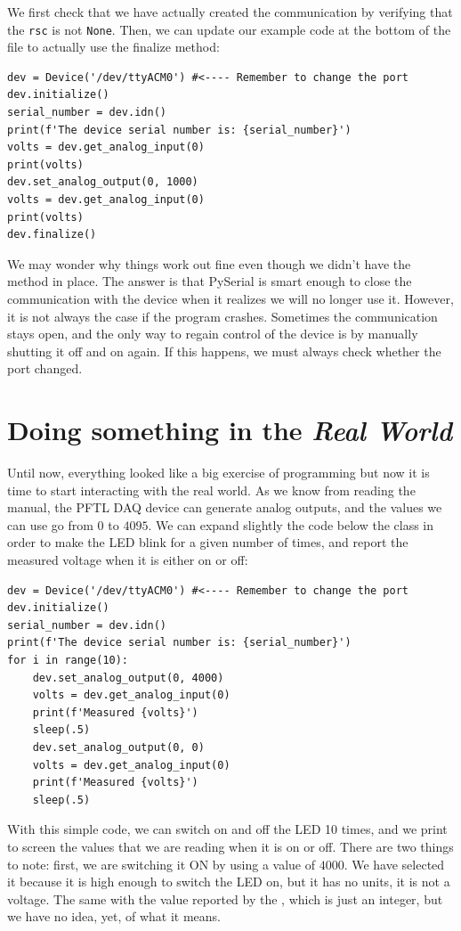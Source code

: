 We first check that we have actually created the communication by verifying that the \texttt{rsc} is not \texttt{None}. Then, we can update our example code at the bottom of the file to actually use the finalize method:

\begin{verbatim}
dev = Device('/dev/ttyACM0') #<---- Remember to change the port
dev.initialize()
serial_number = dev.idn()
print(f'The device serial number is: {serial_number}')
volts = dev.get_analog_input(0)
print(volts)
dev.set_analog_output(0, 1000)
volts = dev.get_analog_input(0)
print(volts)
dev.finalize()
\end{verbatim}

We may wonder why things work out fine even though we didn't have the  method in place. The answer is that PySerial is smart enough to close the communication with the device when it realizes we will no longer use it. However, it is not always the case if the program crashes. Sometimes the communication stays open, and the only way to regain control of the device is by manually shutting it off and on again. If this happens, we must always check whether the port changed.

\section{Doing something in the \emph{Real World}}\label{sec:doing-something-in-theemph}
Until now, everything looked like a big exercise of programming but now it is time to start interacting with the real world. As we know from reading the manual, the {PFTL DAQ} device can generate analog outputs, and the values we can use go from $0$ to $4095$. We can expand slightly the code below the class in order to make the LED blink for a given number of times, and report the measured voltage when it is either on or off:

\begin{verbatim}
dev = Device('/dev/ttyACM0') #<---- Remember to change the port
dev.initialize()
serial_number = dev.idn()
print(f'The device serial number is: {serial_number}')
for i in range(10):
    dev.set_analog_output(0, 4000)
    volts = dev.get_analog_input(0)
    print(f'Measured {volts}')
    sleep(.5)
    dev.set_analog_output(0, 0)
    volts = dev.get_analog_input(0)
    print(f'Measured {volts}')
    sleep(.5)
\end{verbatim}

With this simple code, we can switch on and off the LED 10 times, and we print to screen the values that we are reading when it is on or off. There are two things to note: first, we are switching it ON by using a value of $4000$. We have selected it because it is high enough to switch the LED on, but it has no units, it is not a voltage. The same with the value reported by the , which is just an integer, but we have no idea, yet, of what it means.

